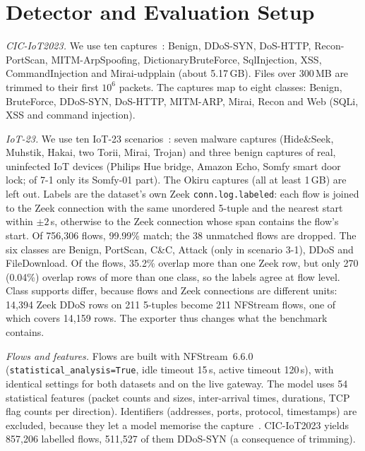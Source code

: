 \section{Detector and Evaluation Setup}\label{sec:setup}

\emph{CIC-IoT2023.} We use ten captures~\cite{neto2023ciciot2023}: Benign, DDoS-SYN, DoS-HTTP, Recon-PortScan, MITM-ArpSpoofing, DictionaryBruteForce, SqlInjection, XSS, CommandInjection and Mirai-udpplain (about 5.17\,GB). Files over 300\,MB are trimmed to their first $10^6$ packets. The captures map to eight classes: Benign, BruteForce, DDoS-SYN, DoS-HTTP, MITM-ARP, Mirai, Recon and Web (SQLi, XSS and command injection).

\emph{IoT-23.} We use ten IoT-23 scenarios~\cite{garcia2020iot23}: seven malware captures (Hide\&Seek, Muhstik, Hakai, two Torii, Mirai, Trojan) and three benign captures of real, uninfected IoT devices (Philips Hue bridge, Amazon Echo, Somfy smart door lock; of 7-1 only its Somfy-01 part). The Okiru captures (all at least 1\,GB) are left out. Labels are the dataset's own Zeek \texttt{conn.log.labeled}: each flow is joined to the Zeek connection with the same unordered 5-tuple and the nearest start within $\pm2$\,s, otherwise to the Zeek connection whose span contains the flow's start. Of 756,306 flows, 99.99\% match; the 38 unmatched flows are dropped. The six classes are Benign, PortScan, C\&C, Attack (only in scenario 3-1), DDoS and FileDownload. Of the flows, 35.2\% overlap more than one Zeek row, but only 270 (0.04\%) overlap rows of more than one class, so the labels agree at flow level. Class supports differ, because flows and Zeek connections are different units: 14,394 Zeek DDoS rows on 211 5-tuples become 211 NFStream flows, one of which covers 14,159 rows. The exporter thus changes what the benchmark contains.

\emph{Flows and features.} Flows are built with NFStream~6.6.0~\cite{aouini2022nfstream} (\texttt{statistical\_analysis=True}, idle timeout 15\,s, active timeout 120\,s), with identical settings for both datasets and on the live gateway. The model uses 54 statistical features (packet counts and sizes, inter-arrival times, durations, TCP flag counts per direction). Identifiers (addresses, ports, protocol, timestamps) are excluded, because they let a model memorise the capture~\cite{arp2022dos}. CIC-IoT2023 yields 857,206 labelled flows, 511,527 of them DDoS-SYN (a consequence of trimming).

